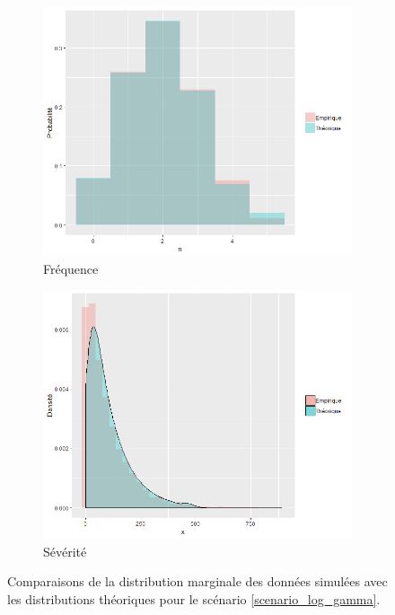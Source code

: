 \documentclass{article}
\begin{document}
		\begin{figure}[H]
			\begin{subfigure}[l]{0.5\textwidth}
				\includegraphics[width=\textwidth]{Graph/log_gamma_N.png}
				\caption{Fréquence}
			\end{subfigure}
			\begin{subfigure}[r]{0.5\textwidth}
				\includegraphics[width=\textwidth]{Graph/log_gamma_X.png}
				\caption{Sévérité}
			\end{subfigure}
			\caption{Comparaisons de la distribution marginale des données simulées avec les distributions théoriques pour le scénario \ref{scenario_log_gamma}.}
			\label{graph_densite_log_gamma}
		\end{figure}
		
\end{document}
